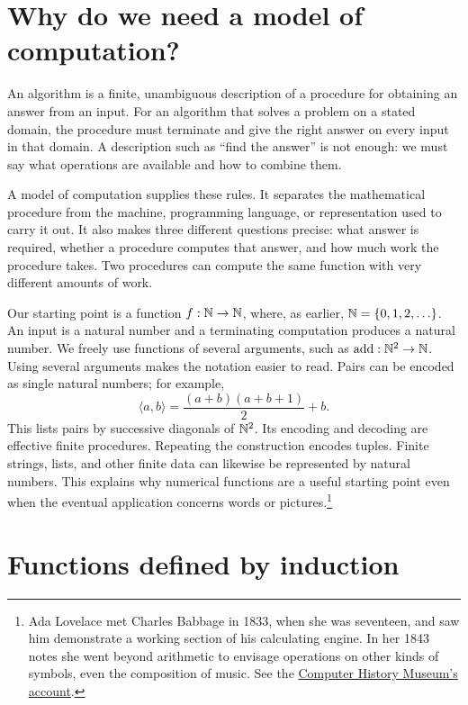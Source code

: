 \section{Why do we need a model of computation?}

An algorithm is a finite, unambiguous description of a procedure for obtaining
an answer from an input. For an algorithm that solves a problem on a stated
domain, the procedure must terminate and give the right answer on every input
in that domain. A description such as ``find the answer'' is not enough: we
must say what operations are available and how to combine them.

A model of computation supplies these rules. It separates the mathematical
procedure from the machine, programming language, or representation used to
carry it out. It also makes three different questions precise: what answer
is required, whether a procedure computes that answer, and how much work the
procedure takes. Two procedures can compute the same function with very
different amounts of work.

Our starting point is a function $f:\mathbb{N}\rightarrow\mathbb{N}$, where, as earlier,
$\mathbb{N}=\{0,1,2,\ldots\}$. An input is a natural number and a terminating
computation produces a natural number. We freely use functions of several
arguments, such as $\operatorname{add}:\mathbb{N}^2\rightarrow\mathbb{N}$. Using several arguments makes the notation easier to read. Pairs can be encoded as
single natural numbers; for example,
\[
\langle a,b\rangle=\frac{(a+b)(a+b+1)}{2}+b.
\]
This lists pairs by successive diagonals of $\mathbb{N}^2$. Its encoding and decoding
are effective finite procedures. Repeating the construction encodes tuples.
Finite strings, lists, and other finite data can likewise be represented by
natural numbers. This explains why numerical functions are a useful starting
point even when the eventual application concerns words or pictures.\footnote{
Ada Lovelace met Charles Babbage in 1833, when she was seventeen, and saw
him demonstrate a working section of his calculating engine. In her 1843
notes she went beyond arithmetic to envisage operations on other kinds of
symbols, even the composition of music. See the
\href{https://www.computerhistory.org/babbage/adalovelace/}{Computer History
Museum's account}.}

\section{Functions defined by induction}

